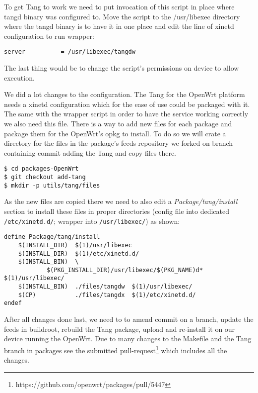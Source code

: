 To get Tang to work we need to put invocation of this script in place where tangd binary was configured to.
Move the script to the /usr/libexec directory where the tangd binary is to have it in one place and edit the line of xinetd configuration to run wrapper:
\begin{lstlisting}[columns=fixed,basicstyle=\ttfamily\footnotesize,tabsize=4,backgroundcolor=\color{yellow!10}]
    server          = /usr/libexec/tangdw
\end{lstlisting}
The last thing would be to change the script's permissions on device to allow execution.

We did a lot changes to the configuration.
The Tang for the OpenWrt platform needs a xinetd configuration which for the ease of use could be packaged with it.
The same with the wrapper script in order to have the service working correctly we also need this file.
There is a way to add new files for each package and package them for the OpenWrt's opkg to install.
To do so we will crate a directory for the files in the package's feeds repository we forked on branch containing commit adding the Tang and copy files there.
\begin{lstlisting}[columns=fixed,basicstyle=\ttfamily\footnotesize,tabsize=4,backgroundcolor=\color{yellow!10}]
$ cd packages-OpenWrt
$ git checkout add-tang
$ mkdir -p utils/tang/files
\end{lstlisting}
As the new files are copied there we need to also edit a {\it Package/tang/install} section to install these files in proper directories (config file into dedicated {\tt /etc/xinetd.d/}; wrapper into {\tt /usr/libexec/}) as shown:\newpage
\begin{lstlisting}[columns=fixed,basicstyle=\ttfamily\footnotesize,tabsize=4,backgroundcolor=\color{yellow!10}]
define Package/tang/install
	$(INSTALL_DIR)	$(1)/usr/libexec
	$(INSTALL_DIR)	$(1)/etc/xinetd.d/
	$(INSTALL_BIN)	\
			$(PKG_INSTALL_DIR)/usr/libexec/$(PKG_NAME)d*  $(1)/usr/libexec/
	$(INSTALL_BIN)	./files/tangdw	$(1)/usr/libexec/
	$(CP)			./files/tangdx	$(1)/etc/xinetd.d/
endef
\end{lstlisting}
After all changes done last, we need to to amend commit on a branch, update the feeds in buildroot, rebuild the Tang package, upload and re-install it on our device running the OpenWrt.
Due to many changes to the Makefile and the Tang branch in packages see the submitted pull-request\footnote{https://github.com/openwrt/packages/pull/5447} which includes all the changes.



